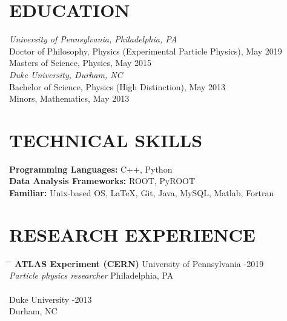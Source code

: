\documentclass[11pt]{res}
\begin{document}
\begin{resume}

 
\section{EDUCATION}          
    {\it University of Pennsylvania, Philadelphia, PA} \\
    Doctor of Philosophy, Physics (Experimental Particle Physics), May 2019 \\
    Masters of Science, Physics, May 2015 \\
    \newline
    {\it Duke University, Durham, NC} \\        
    Bachelor of Science, Physics (High Distinction), May 2013   \\       
    Minors, Mathematics, May 2013 
 
\section{TECHNICAL SKILLS}
    {\bf Programming Languages:} C++, Python\\
    {\bf Data Analysis Frameworks:} ROOT, PyROOT\\
    {\bf Familiar:} Unix-based OS, \LaTeX, Git, Java, MySQL, Matlab, Fortran

\section{RESEARCH EXPERIENCE}\vspace{-10pt}
   \begin{tabbing}
   \hspace{2.5in}\= \hspace{2.85in} \= \kill %
    {\bf ATLAS Experiment (CERN)} \>University of Pennsylvania -2019\\
    {\it Particle physics researcher} \> Philadelphia, PA \\
    \\
    \> Duke University -2013 \\
    \> Durham, NC
   \end{tabbing}\vspace{-18pt}


\end{resume}
\end{document}
